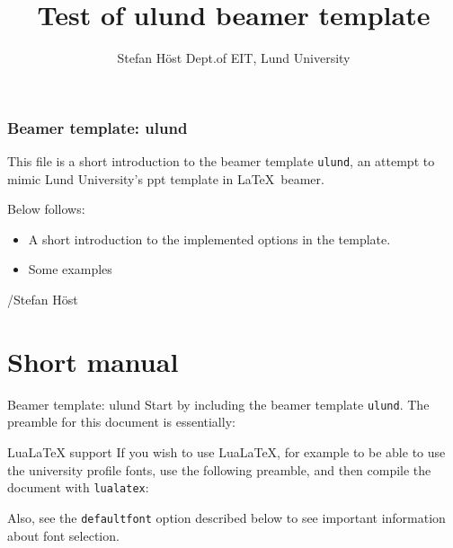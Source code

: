 \documentclass[aspectratio=1610]{beamer}
\title[ulund beamer]{Test of ulund beamer template}
\author[S. Höst]{%
  Stefan Höst\newline
  Dept.\@ of EIT, Lund University}
\begin{document}
\begin{frame}[plain]%
  \titlepage
\end{frame}

\begin{frame}
  \frametitle{Beamer template: ulund}
  This file is a short introduction to the beamer template \texttt{ulund}, an attempt to mimic Lund University's ppt template in \LaTeX\ beamer.

Below follows:
\begin{itemize}
\item A short introduction to the implemented options in the template. 
\item Some examples
\end{itemize}

/Stefan Höst
\end{frame}


\section{Short manual}

\begin{frame}[fragile]{Beamer template: ulund}
  Start by including the beamer template \verb|ulund|. The preamble for this document is essentially: 
\end{frame}

\begin{frame}[fragile]{LuaLaTeX support}
	If you wish to use LuaLaTeX, for example to be able to use the university profile fonts, use the following preamble, and then compile the document with \texttt{lualatex}:
Also, see the \texttt{defaultfont} option described below to see important information about font selection.
\end{frame}
\end{document}
